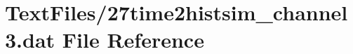 \hypertarget{27time2histsim__channel3_8dat}{}\section{Text\+Files/27time2histsim\+\_\+channel3.dat File Reference}
\label{27time2histsim__channel3_8dat}
